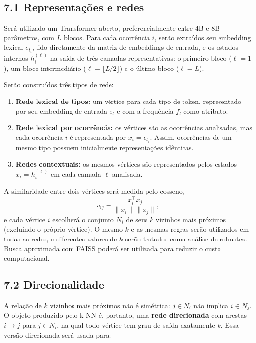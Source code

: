 \documentclass[11pt,a4paper]{article}
\begin{document}
\subsection*{7.1 Representações e redes}

Será utilizado um Transformer aberto, preferencialmente entre
4B e 8B parâmetros, com $L$ blocos. Para cada ocorrência $i$, serão extraídos
seu embedding lexical $e_{t_i}$, lido diretamente da matriz de embeddings de
entrada, e os estados internos $h_i^{(\ell)}$ na saída de três camadas
representativas: o primeiro bloco ($\ell=1$), um bloco intermediário
($\ell=\lfloor L/2\rfloor$) e o último bloco ($\ell=L$).

Serão construídos três tipos de rede:

\begin{enumerate}

    \item \textbf{Rede lexical de tipos:} um vértice para cada tipo de token,
    representado por seu embedding de entrada $e_t$ e com a frequência $f_t$
    como atributo.

    \item \textbf{Rede lexical por ocorrência:} os vértices são as ocorrências
    analisadas, mas cada ocorrência $i$ é representada por
    $x_i=e_{t_i}$. Assim, ocorrências de um mesmo tipo possuem inicialmente
    representações idênticas.

    \item \textbf{Redes contextuais:} os mesmos vértices são representados
    pelos estados $x_i=h_i^{(\ell)}$ em cada camada $\ell$ analisada.

\end{enumerate}

A similaridade entre dois vértices será medida pelo cosseno,
\[
s_{ij} =
\frac{x_i^\top x_j}
{\lVert x_i\rVert\,\lVert x_j\rVert},
\]
e cada vértice $i$ escolherá o conjunto $N_i$ de seus $k$ vizinhos mais
próximos (excluindo o próprio vértice). O mesmo $k$ e as mesmas regras serão
utilizados em todas as redes, e diferentes valores de $k$ serão testados como
análise de robustez. Busca aproximada com FAISS poderá ser utilizada para
reduzir o custo computacional.

\subsection*{7.2 Direcionalidade}

A relação de $k$ vizinhos mais próximos não é simétrica: $j\in N_i$ não
implica $i\in N_j$. O objeto produzido pelo k-NN é, portanto, uma
\textbf{rede direcionada} com arestas $i\to j$ para $j\in N_i$, na qual todo
vértice tem grau de saída exatamente $k$. Essa versão direcionada será usada
para:
\end{document}
